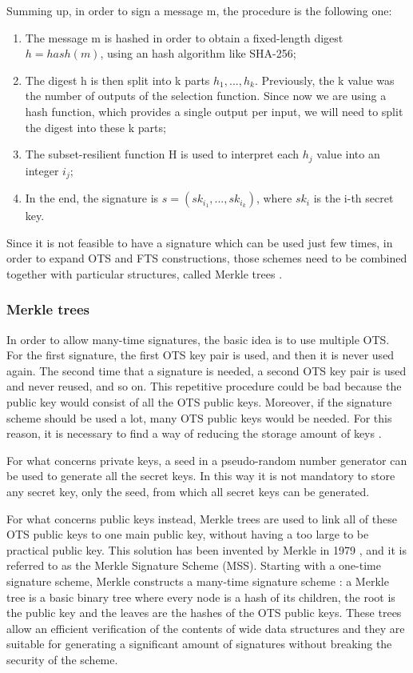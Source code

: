 \documentclass[a4paper,12pt]{article}
\begin{document}
Summing up, in order to sign a message m, the procedure is the following one:
\begin{enumerate}
	\item The message m is hashed in order to obtain a fixed-length digest $h=hash(m)$, using an hash algorithm like SHA-256;
	\item The digest h is then split into k parts $h_{1},...,h_{k}$. Previously, the k value was the number of outputs of the selection function. Since now we are using a hash function, which provides a single output per input, we will need to split the digest into these k parts;
	\item The subset-resilient function H is used to interpret each $h_{j}$ value into an integer $i_{j}$;
	\item In the end, the signature is $s=(sk_{i_{1}},...,sk_{i_{k}})$, where $sk_{i}$ is the i-th secret key.

\end{enumerate}

Since it is not feasible to have a signature which can be used just few times, in order to expand OTS and FTS constructions, those schemes need to be combined together with particular structures, called Merkle trees \cite{13_faultattacks}.


\subsubsection{Merkle trees}
\label{subsub:merkle}

In order to allow many-time signatures, the basic idea is to use multiple OTS. For the first signature, the first OTS key pair is used, and then it is never used again. The second time that a signature is needed, a second OTS key pair is used and never reused, and so on. This repetitive procedure could be bad because the public key would consist of all the OTS public keys. Moreover, if the signature scheme should be used a lot, many OTS public keys would be needed. 
For this reason, it is necessary to find a way of reducing the storage amount of keys \cite{53_hbs}.

For what concerns private keys, a seed in a pseudo-random number generator can be used to generate all the secret keys. In this way it is not mandatory to store any secret key, only the seed, from which all secret keys can be generated.

For what concerns public keys instead, Merkle trees are used to link all of these OTS public keys to one main public key, without having a too large to be practical public key.  This solution has been invented by Merkle in 1979 \cite{30_Merkle}, and it is referred to as the Merkle Signature Scheme (MSS).
Starting with a one-time signature scheme, Merkle constructs a many-time signature scheme \cite{1_sphincspaper}: a Merkle tree is a basic binary tree where every node is a hash of its children, the root is the public key and the leaves are the hashes of the OTS public keys. 
These trees allow an efficient verification of the contents of wide data structures and they are suitable for generating a significant amount of signatures without breaking the security of the scheme.
\end{document}
